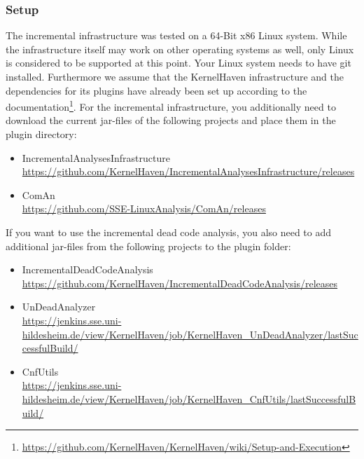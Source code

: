 \documentclass[a4paper]{article}
\begin{document}
\subsubsection{Setup}

The incremental infrastructure was tested on a 64-Bit x86 Linux system. While the infrastructure itself may work on other operating systems as well, only Linux is considered to be supported at this point. Your Linux system needs to have git installed. Furthermore we assume that the KernelHaven infrastructure and the dependencies for its plugins have already been set up according to the documentation\footnote{\url{https://github.com/KernelHaven/KernelHaven/wiki/Setup-and-Execution}}. 
For the incremental infrastructure, you additionally need to download the current jar-files of the following projects and place them in the plugin directory:

\begin{sloppypar}
\begin{itemize}
	\item IncrementalAnalysesInfrastructure \\ \url{https://github.com/KernelHaven/IncrementalAnalysesInfrastructure/releases}
	\item ComAn \\ \url{https://github.com/SSE-LinuxAnalysis/ComAn/releases}
\end{itemize}
\end{sloppypar}

If you want to use the incremental dead code analysis, you also need to add additional jar-files from the following projects to the plugin folder:
\begin{sloppypar}
\begin{itemize}
	\item IncrementalDeadCodeAnalysis \\ \url{https://github.com/KernelHaven/IncrementalDeadCodeAnalysis/releases}
	\item UnDeadAnalyzer \\ \url{https://jenkins.sse.uni-hildesheim.de/view/KernelHaven/job/KernelHaven_UnDeadAnalyzer/lastSuccessfulBuild/}
	\item CnfUtils \\ \url{https://jenkins.sse.uni-hildesheim.de/view/KernelHaven/job/KernelHaven_CnfUtils/lastSuccessfulBuild/}
\end{itemize}
	
\end{sloppypar}
\end{document}
